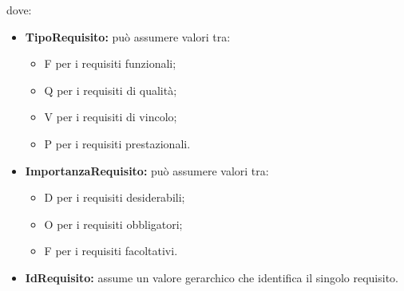 	dove:
	\begin{itemize}
		\item \textbf{TipoRequisito:} può assumere valori tra:
		\begin{itemize}
			\item F per i requisiti funzionali;
			\item Q per i requisiti di qualità;
			\item V per i requisiti di vincolo;
			\item P per i requisiti prestazionali.
		\end{itemize}
		\item \textbf{ImportanzaRequisito:} può assumere valori tra:
		\begin{itemize}
			\item D per i requisiti desiderabili;		
			\item O per i requisiti obbligatori;
			\item F per i requisiti facoltativi.
		\end{itemize}

		\item \textbf{IdRequisito:} assume un valore gerarchico che identifica il singolo requisito.
	
	\end{itemize}
